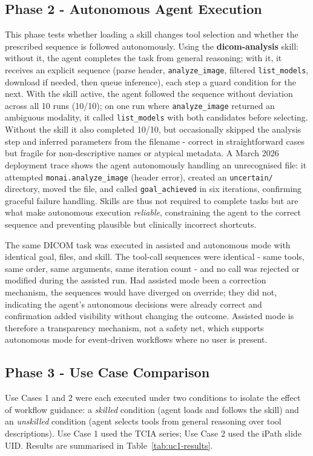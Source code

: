 \documentclass[conference]{IEEEtran}
\begin{document}
\subsection{Phase 2  -  Autonomous Agent Execution}
This phase tests whether loading a skill changes tool selection and whether the prescribed sequence is followed autonomously. Using the \textbf{dicom-analysis} skill: without it, the agent completes the task from general reasoning; with it, it receives an explicit sequence (parse header, \texttt{analyze\_image}, filtered \texttt{list\_models}, download if needed, then queue inference), each step a guard condition for the next. With the skill active, the agent followed the sequence without deviation across all 10 runs (10/10); on one run where \texttt{analyze\_image} returned an ambiguous modality, it called \texttt{list\_models} with both candidates before selecting. Without the skill it also completed 10/10, but occasionally skipped the analysis step and inferred parameters from the filename - correct in straightforward cases but fragile for non-descriptive names or atypical metadata. A March 2026 deployment trace shows the agent autonomously handling an unrecognised file: it attempted \texttt{monai.analyze\_image} (header error), created an \texttt{uncertain/} directory, moved the file, and called \texttt{goal\_achieved} in six iterations, confirming graceful failure handling. Skills are thus not required to complete tasks but are what make autonomous execution \emph{reliable}, constraining the agent to the correct sequence and preventing plausible but clinically incorrect shortcuts.

The same DICOM task was executed in assisted and autonomous mode with identical goal, files, and skill. The tool-call sequences were identical - same tools, same order, same arguments, same iteration count - and no call was rejected or modified during the assisted run. Had assisted mode been a correction mechanism, the sequences would have diverged on override; they did not, indicating the agent's autonomous decisions were already correct and confirmation added visibility without changing the outcome. Assisted mode is therefore a transparency mechanism, not a safety net, which supports autonomous mode for event-driven workflows where no user is present.

\subsection{Phase 3  -  Use Case Comparison}
Use Cases 1 and 2 were each executed under two conditions to isolate the effect of workflow guidance: a \emph{skilled} condition (agent loads and follows the skill) and an \emph{unskilled} condition (agent selects tools from general reasoning over tool descriptions). Use Case 1 used the TCIA series; Use Case 2 used the iPath slide UID. Results are summarised in Table~\ref{tab:uc1-results}.
\end{document}
